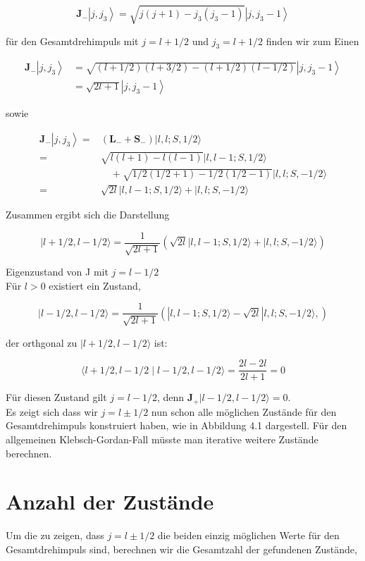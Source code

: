 \documentclass[10pt, letterpaper]{article}
\begin{document}
$$
\mathbf{J}_{-}\left|j, j_{3}\right\rangle=\sqrt{j(j+1)-j_{3}\left(j_{3}-1\right)}\left|j, j_{3}-1\right\rangle
$$

für den Gesamtdrehimpuls mit $j=l+1 / 2$ und $j_{3}=l+1 / 2$ finden wir zum Einen

$$
\begin{aligned}
\mathbf{J}_{-}\left|j, j_{3}\right\rangle & =\sqrt{(l+1 / 2)(l+3 / 2)-(l+1 / 2)(l-1 / 2)}\left|j, j_{3}-1\right\rangle \\
& =\sqrt{2 l+1}\left|j, j_{3}-1\right\rangle
\end{aligned}
$$

sowie

$$
\begin{aligned}
\mathbf{J}_{-}\left|j, j_{3}\right\rangle= & \left(\mathbf{L}_{-}+\mathbf{S}_{-}\right)|l, l ; S, 1 / 2\rangle \\
= & \sqrt{l(l+1)-l(l-1)}|l, l-1 ; S, 1 / 2\rangle \\
& \quad+\sqrt{1 / 2(1 / 2+1)-1 / 2(1 / 2-1)}|l, l ; S,-1 / 2\rangle \\
= & \sqrt{2 l}|l, l-1 ; S, 1 / 2\rangle+|l, l ; S,-1 / 2\rangle
\end{aligned}
$$

Zusammen ergibt sich die Darstellung

$$
|l+1 / 2, l-1 / 2\rangle=\frac{1}{\sqrt{2 l+1}}(\sqrt{2 l}|l, l-1 ; S, 1 / 2\rangle+|l, l ; S,-1 / 2\rangle)
$$

Eigenzustand von J mit $j=l-1 / 2$\\
Für $l>0$ existiert ein Zustand,

$$
|l-1 / 2, l-1 / 2\rangle=\frac{1}{\sqrt{2 l+1}}(|l, l-1 ; S, 1 / 2\rangle-\sqrt{2 l}|l, l ; S,-1 / 2\rangle,)
$$

der orthgonal zu $|l+1 / 2, l-1 / 2\rangle$ ist:

$$
\langle l+1 / 2, l-1 / 2 \mid l-1 / 2, l-1 / 2\rangle=\frac{2 l-2 l}{2 l+1}=0
$$

Für diesen Zustand gilt $j=l-1 / 2$, denn $\mathbf{J}_{+}|l-1 / 2, l-1 / 2\rangle=0$.\\
Es zeigt sich dass wir $j=l \pm 1 / 2$ nun schon alle möglichen Zustände für den Gesamtdrehimpuls konstruiert haben, wie in Abbildung 4.1 dargestell. Für den allgemeinen Klebsch-Gordan-Fall müsste man iterative weitere Zustände berechnen.

\section*{Anzahl der Zustände}
Um die zu zeigen, dass $j=l \pm 1 / 2$ die beiden einzig möglichen Werte für den Gesamtdrehimpuls sind, berechnen wir die Gesamtzahl der gefundenen Zustände,
\end{document}

